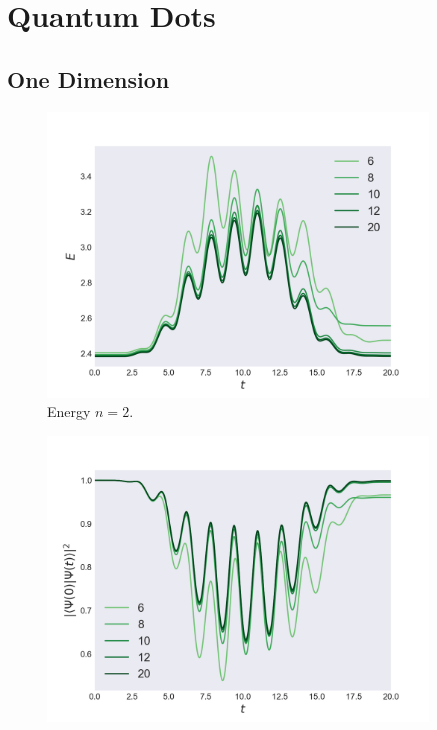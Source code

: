\chapter{Quantum Dots}

\section{One Dimension}

\begin{figure}
    \centering
    \includegraphics[width=0.9\textwidth]{results/figures/1D/n=2energy.png} 
    \caption{Energy $n=2$.}
    \label{fig:1d_n2_E}
\end{figure}

\begin{figure}[]
    \centering
    \includegraphics[width=0.9\textwidth]{results/figures/1D/n=2overlap.png} 
    \caption{}
    \label{}
\end{figure}